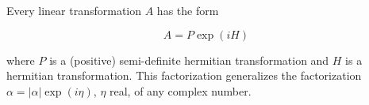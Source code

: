 Every linear transformation $A$ has the form

$$A = P \exp(iH)$$

where $P$ is a (positive) semi-definite hermitian transformation and $H$ is a hermitian transformation. This factorization generalizes the factorization $\alpha = |\alpha| \exp(i\eta)$, $\eta$ real, of any complex number.
